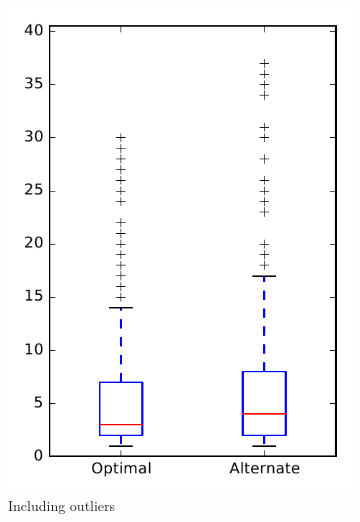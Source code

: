 
\begin{figure}
    \centering
    \begin{subfigure}{.4\textwidth}
        \centering
        \includegraphics[height=0.4\textheight]{figures/combo/dit_rq2_all}
        \caption{Including outliers}\label{fig:combo:dit:rq2:all_outlier}
    \end{subfigure}%
    \begin{subfigure}{.4\textwidth}
        \centering

\end{subfigure}
\end{figure}
